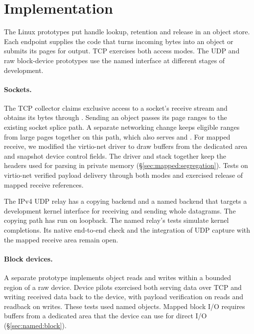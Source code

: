 \section{Implementation}
\label{sec:impl}

The Linux prototypes put handle lookup, retention and release in an \iouring
object store. Each endpoint supplies the code that turns incoming bytes into an
object or submits its pages for output. TCP exercises both access modes. The UDP
and raw block-device prototypes use the named interface at different stages of
development.

\paragraph{Sockets.} The TCP collector claims exclusive access to a socket's
receive stream and obtains its bytes through . Sending an
object passes its page ranges to the existing socket splice path. A separate
networking change keeps eligible ranges from large pages together on this path,
which also serves \splice and \sendfile. For mapped receive, we modified the
virtio-net driver to draw buffers from the dedicated area and snapshot device
control fields. The driver and stack together keep the headers used for parsing
in private memory (\S\ref{sec:mapped:segregation}). Tests on virtio-net verified
payload delivery through both modes and exercised release of mapped receive
references.

The IPv4 UDP relay has a copying backend and a named backend that targets a
development kernel interface for receiving and sending whole datagrams. The
copying path has run on loopback. The named relay's tests simulate kernel
completions. Its native end-to-end check and the integration of UDP capture with
the mapped receive area remain open.

\paragraph{Block devices.} A separate prototype implements object reads and writes
within a bounded region of a raw device. Device pilots exercised both serving data
over TCP and writing received data back to the device, with payload verification
on reads and readback on writes. These tests used named objects. Mapped block I/O
requires buffers from a dedicated area that the device can use for direct I/O
(\S\ref{sec:named:block}).

